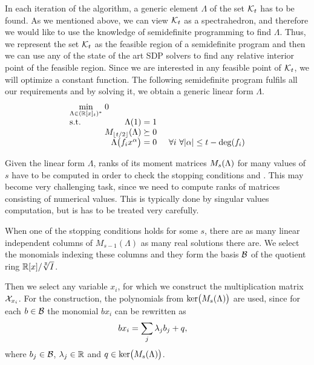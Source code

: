 In each iteration of the algorithm, a generic element $\Lambda$ of the set $\mathcal{K}_t$ has to be found.
As we mentioned above, we can view $\mathcal{K}_t$ as a spectrahedron, and therefore we would like to use the knowledge of semidefinite programming to find $\Lambda$.
Thus, we represent the set $\mathcal{K}_t$ as the feasible region of a semidefinite program and then we can use any of the state of the art SDP solvers to find any relative interior point of the feasible region.
Since we are interested in any feasible point of $\mathcal{K}_t$, we will optimize a constant function.
The following semidefinite program  fulfils all our requirements and by solving it, we obtain a generic linear form $\Lambda$.
\begin{align}
  \arraycolsep=1.4pt
  \begin{array}{lrcl@{\hskip0.5cm}l}
    \displaystyle \min_{\Lambda\in(\R[x]_t)^*} & \multicolumn{3}{l}{0} \\
    \text{s.t.} & \Lambda(1) &=& 1\\
    & \MLt &\succeq& 0\\
    & \Lambda\big(f_ix^\alpha\big) &=& 0 & \forall i\ \forall|\alpha| \leq t - \deg(f_i)
  \end{array}\labeleq{POP:sol:SDP}
\end{align}

Given the linear form $\Lambda$, ranks of its moment matrices $M_s(\Lambda)$ for many values of $s$ have to be computed in order to check the stopping conditions  and .
This may become very challenging task, since we need to compute ranks of matrices consisting of numerical values.
This is typically done by singular values computation, but is has to be treated very carefully.

When one of the stopping conditions holds for some $s$, there are as many linear independent columns of $M_{s-1}(\Lambda)$ as many real solutions there are.
We select the monomials indexing these columns and they form the basis $\mathcal{B}$ of the quotient ring $\mathbb{R}[x]/\sqrt[\mathbb{R}]{I}$.

Then we select any variable $x_i$, for which we construct the multiplication matrix $\mathcal{X}_{x_i}$.
For the construction, the polynomials from $\operatorname{ker}\!\big(M_s(\Lambda)\big)$ are used, since for each $b\in\mathcal{B}$ the monomial $bx_i$ can be rewritten as
\begin{align}
  bx_i &= \sum_j \lambda_jb_j + q,\labeleq{POP:sol:baseFromKernel}
\end{align}
where $b_j\in\mathcal{B}$, $\lambda_j\in\mathbb{R}$ and $q\in\operatorname{ker}\!\big(M_s(\Lambda)\big)$.

